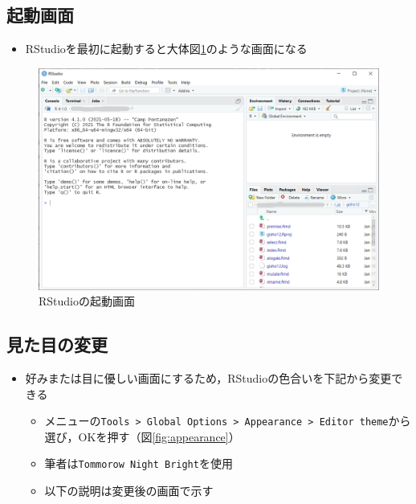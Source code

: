 \documentclass[
  xelatex,ja=standard, b5paper]{bxjsbook}
\providecommand{\tightlist}{%
  \setlength{\itemsep}{0pt}\setlength{\parskip}{0pt}}
\begin{document}
\hypertarget{p-opening}{%
\subsection{起動画面}\label{p-opening}}

\begin{itemize}
\tightlist
\item
  RStudioを最初に起動すると大体図\ref{fig:start}のような画面になる
\end{itemize}

\begin{figure}

{\centering \includegraphics[width=0.8\linewidth]{images/start} 

}

\caption{RStudioの起動画面}\label{fig:start}
\end{figure}

\hypertarget{p-theme}{%
\subsection{見た目の変更}\label{p-theme}}

\begin{itemize}
\tightlist
\item
  好みまたは目に優しい画面にするため，RStudioの色合いを下記から変更できる

  \begin{itemize}
  \tightlist
  \item
    メニューの\texttt{Tools\ \textgreater{}\ Global\ Options\ \textgreater{}\ Appearance\ \textgreater{}\ Editor\ theme}から選び，OKを押す（図\ref{fig:appearance}）
  \item
    筆者は\texttt{Tommorow\ Night\ Bright}を使用
  \item
    以下の説明は変更後の画面で示す
  \end{itemize}
\end{itemize}
\end{document}
